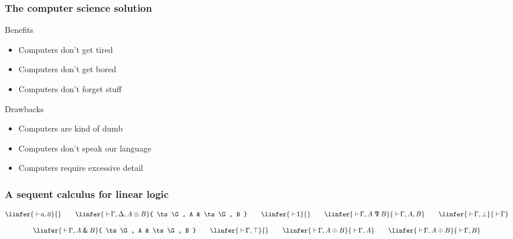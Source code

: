 \documentclass{beamer}
\begin{document}
\begin{frame}
  \frametitle{The \alert<2->{computer} science solution}

  \pause


  \bigskip \pause

  Benefits
  \begin{itemize}
  \item Computers don't get tired
  \item Computers don't get bored
  \item Computers don't forget stuff
  \end{itemize}

  \bigskip \pause

  Drawbacks
  \begin{itemize}
  \item Computers are kind of dumb
  \item Computers don't speak our language
  \item Computers require excessive detail
  \end{itemize}
\end{frame}

\begin{frame}
  \frametitle{A sequent calculus for linear logic}

  \begin{gather*}
    \linfer{
      \ts a, \dual a
    }{}
    \qquad
    \linfer{
      \ts \G, \D, A \TENS B
    }{
      \ts \G, A
      &
      \ts \G, B
    }
    \qquad
    \linfer{
      \ts \ONE
    }{}
    \qquad
    \linfer{
      \ts \G, A \PAR B
    }{
      \ts \G, A, B
    }
    \qquad
    \linfer{
      \ts \G, \BOT
    }{
      \ts \G
    }
    \\[2ex]
    \linfer{
      \ts \G, A \WITH B
    }{
      \ts \G, A
      &
      \ts \G, B
    }
    \qquad
    \linfer{
      \ts \G, \TOP
    }{}
    \qquad
    \linfer{
      \ts \G, A \PLUS B
    }{
      \ts \G, A
    }
    \qquad
    \linfer{
      \ts \G, A \PLUS B
    }{
      \ts \G, B
    }
  \end{gather*}

  \pause\pause


\end{frame}
\end{document}
